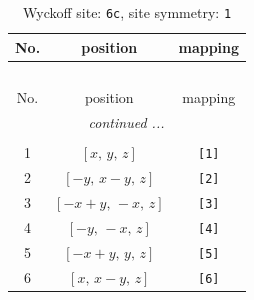 \documentclass[fleqn,8pt]{jsarticle}
\begin{document}
\begin{longtable}{ccc}
\caption{Wyckoff site: {\tt 6c}, site symmetry: {\tt 1}}
 \\
 \hline \hline
No. & position & mapping \\ \hline \endfirsthead

\multicolumn{2}{l}{\tablename\ \thetable{}} \\
 \hline \hline
No. & position & mapping \\ \hline \endhead

 \hline \hline
\multicolumn{2}{r}{\footnotesize\it continued ...} \\ \endfoot

 \hline \hline
\multicolumn{2}{r}{} \\ \endlastfoot

1 & $\left[ x,\, y,\, z \right]$ & {\tt [1]} \\ \hline
2 & $\left[ - y,\, x - y,\, z \right]$ & {\tt [2]} \\ \hline
3 & $\left[ - x + y,\, - x,\, z \right]$ & {\tt [3]} \\ \hline
4 & $\left[ - y,\, - x,\, z \right]$ & {\tt [4]} \\ \hline
5 & $\left[ - x + y,\, y,\, z \right]$ & {\tt [5]} \\ \hline
6 & $\left[ x,\, x - y,\, z \right]$ & {\tt [6]} \\
\end{longtable}
\end{document}
